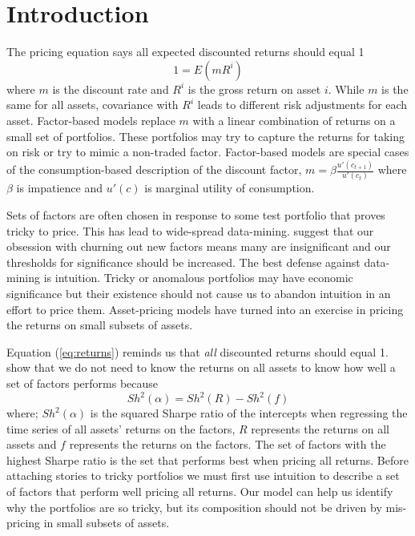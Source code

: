 
\section{Introduction}

The pricing equation says all expected discounted returns should equal 1
\begin{equation}
\label{eq:returns}
1=E(mR^i)
\end{equation}
where $m$ is the discount rate and $R^i$ is the gross return on asset $i$.
While $m$ is the same for all assets, covariance with $R^i$ leads to different 
risk adjustments for each asset.
Factor-based models replace $m$ with a linear combination of returns on 
a small set of portfolios. These portfolios may try to capture the returns for 
taking on risk or try to mimic a non-traded factor.
Factor-based models are special cases of the consumption-based description 
of the discount factor, $m=\beta\frac{u'(c_{t+1})}{u'(c_t)}$ where $\beta$ is 
impatience and $u'(c)$ is marginal utility of consumption.

Sets of factors are often chosen in response to some test portfolio that 
proves tricky to price.
This has lead to wide-spread data-mining.
\textcite{harvey2016and} suggest that our obsession with churning out new 
factors means many are insignificant and our thresholds for significance 
should be increased.
The best defense against data-mining is intuition.
Tricky or anomalous portfolios may have economic significance but their 
existence should not cause us to abandon intuition in an effort to price them.
Asset-pricing models have turned into an exercise in pricing the returns on 
small subsets of assets.

Equation (\ref{eq:returns}) reminds us that \emph{all} discounted returns 
should equal 1.
\textcite{barillas2016alpha} show that we do not need to know the returns on 
all assets to know how well a set of factors performs because
\begin{equation}
\label{eq:maxsh}
Sh^2(\alpha) = Sh^2(R) - Sh^2(f)
\end{equation}
where; $Sh^2(\alpha)$ is the squared Sharpe ratio of the intercepts when 
regressing the time series of all assets' returns on the factors, $R$ 
represents the returns on all assets and $f$ represents the returns on the 
factors.
The set of factors with the highest Sharpe ratio is the set that performs best 
when pricing all returns.
Before attaching stories to tricky portfolios we must first use intuition to 
describe a set of factors that perform well pricing all returns.
Our model can help us identify why the portfolios are so tricky, but its 
composition should not be driven by mis-pricing in small subsets of assets.

